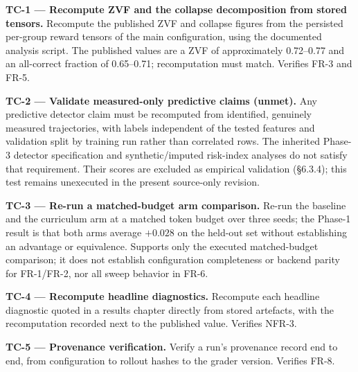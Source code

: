 \documentclass[12pt,a4paper]{report}
\begin{document}
\textbf{TC-1 --- Recompute ZVF and the collapse decomposition from
stored tensors.} Recompute the published ZVF and collapse figures from
the persisted per-group reward tensors of the main configuration, using
the documented analysis script. The published values are a ZVF of
approximately 0.72--0.77 and an all-correct fraction of 0.65--0.71;
recomputation must match. Verifies FR-3 and FR-5.

\textbf{TC-2 --- Validate measured-only predictive claims (unmet).} Any
predictive detector claim must be recomputed from identified, genuinely
measured trajectories, with labels independent of the tested features
and validation split by training run rather than correlated rows. The
inherited Phase-3 detector specification and synthetic/imputed
risk-index analyses do not satisfy that requirement. Their scores are
excluded as empirical validation (§6.3.4); this test remains unexecuted
in the present source-only revision.

\textbf{TC-3 --- Re-run a matched-budget arm comparison.} Re-run the
baseline and the curriculum arm at a matched token budget over three
seeds; the Phase-1 result is that both arms average \(+0.028\) on the
held-out set without establishing an advantage or equivalence. Supports
only the executed matched-budget comparison; it does not establish
configuration completeness or backend parity for FR-1/FR-2, nor all
sweep behavior in FR-6.

\textbf{TC-4 --- Recompute headline diagnostics.} Recompute each
headline diagnostic quoted in a results chapter directly from stored
artefacts, with the recomputation recorded next to the published value.
Verifies NFR-3.

\textbf{TC-5 --- Provenance verification.} Verify a run's provenance
record end to end, from configuration to rollout hashes to the grader
version. Verifies FR-8.
\end{document}
